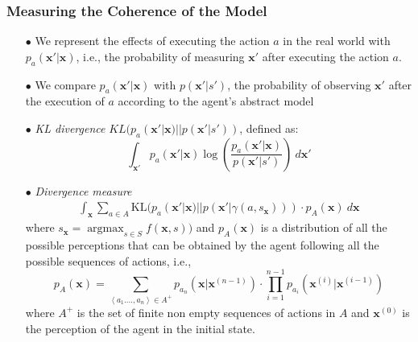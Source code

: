 \documentclass{beamer}
\DeclareMathOperator*{\argmax}{argmax}
\def\bx{\pmb{x}}
\begin{document}
\begin{frame}
\frametitle{Measuring the Coherence of the Model}
\footnotesize
\begin{itemize}
\item[$\bullet$] 
We represent the effects of executing the action $a$ in the real world with
$p_a(\bx'|\bx)$, i.e., the probability of measuring $\bx'$ after executing the action $a$.
\item[$\bullet$] 
We compare $p_a(\bx'|\bx)$ with $p(\bx'|s')$, 
the probability of observing $\bx'$ after the execution
of $a$ according to the agent's abstract model 
\item[$\bullet$] 
{\em KL divergence} 
$KL(p_a(\bx'|\bx)||p(\bx'|s'))$,
defined as: 
$$
\int_{\bx'}p_a(\bx'|\bx)\log\left(\frac{p_a(\bx'|\bx)}{p(\bx'|s')}\right)\:d\bx'
$$
\item[$\bullet$] 
{\em Divergence measure} 
\begin{align}
  \label{eq:coherence}
  \int_{\bx}\sum_{a\in
  A}\mathrm{KL}(p_a(\bx'|\bx)||p(\bx'|\gamma(a,s_{\bx})))\cdot p_A(\bx)\: d\bx
\end{align}
where $s_{\bx}=\argmax_{s\in  S}f(\bx,s))$ and $p_A(\bx)$ is a distribution of all the possible perceptions
that can be obtained by the agent following all the possible sequences
of actions, i.e., 
$$
p_A(\bx)=\sum_{\left<a_1.\dots,a_n\right>\in A^+}p_{a_n}(\bx|\bx^{(n-1)})\cdot\prod_{i=1}^{n-1}p_{a_i}(\bx^{(i)}|\bx^{(i-1)})
$$
\def\ba{\mathbf{a}}
%
where $A^+$ is the set of finite non empty sequences of actions in $A$
and $\bx^{(0)}$ is the perception of the agent in the initial state. 
\end{itemize}

\end{frame}
\end{document}
